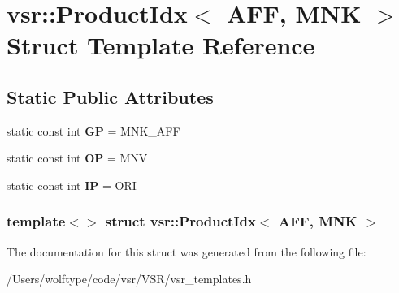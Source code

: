 \hypertarget{structvsr_1_1_product_idx_3_01_a_f_f_00_01_m_n_k_01_4}{\section{vsr\-:\-:Product\-Idx$<$ A\-F\-F, M\-N\-K $>$ Struct Template Reference}
\label{structvsr_1_1_product_idx_3_01_a_f_f_00_01_m_n_k_01_4}
}
\subsection*{Static Public Attributes}
\begin{DoxyCompactItemize}
\item 
\hypertarget{structvsr_1_1_product_idx_3_01_a_f_f_00_01_m_n_k_01_4_a298beaea31f6348d4e8936c44f51f2c2}{static const int {\bfseries G\-P} = M\-N\-K\-\_\-\-A\-F\-F}\label{structvsr_1_1_product_idx_3_01_a_f_f_00_01_m_n_k_01_4_a298beaea31f6348d4e8936c44f51f2c2}

\item 
\hypertarget{structvsr_1_1_product_idx_3_01_a_f_f_00_01_m_n_k_01_4_a6e0413ace8353af84e25ce7457f0049e}{static const int {\bfseries O\-P} = M\-N\-V}\label{structvsr_1_1_product_idx_3_01_a_f_f_00_01_m_n_k_01_4_a6e0413ace8353af84e25ce7457f0049e}

\item 
\hypertarget{structvsr_1_1_product_idx_3_01_a_f_f_00_01_m_n_k_01_4_a682bbaeef9b1156484a8ff46f3dd6014}{static const int {\bfseries I\-P} = O\-R\-I}\label{structvsr_1_1_product_idx_3_01_a_f_f_00_01_m_n_k_01_4_a682bbaeef9b1156484a8ff46f3dd6014}

\end{DoxyCompactItemize}
\subsubsection*{template$<$$>$ struct vsr\-::\-Product\-Idx$<$ A\-F\-F, M\-N\-K $>$}



The documentation for this struct was generated from the following file\-:\begin{DoxyCompactItemize}
\item 
/\-Users/wolftype/code/vsr/\-V\-S\-R/vsr\-\_\-templates.\-h\end{DoxyCompactItemize}
